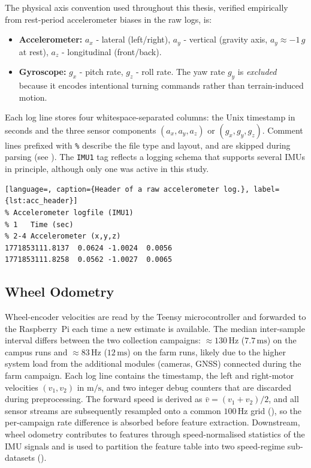 The physical axis convention used throughout this thesis, verified empirically from rest-period accelerometer biases in the raw logs, is:
\begin{itemize}
    \item \textbf{Accelerometer:} $a_x$ - lateral (left/right), $a_y$ - vertical (gravity axis, $a_y \approx -1\,g$ at  rest), $a_z$ - longitudinal (front/back).
    \item \textbf{Gyroscope:} $g_x$ - pitch rate, $g_z$ - roll rate. The yaw rate $g_y$ is \emph{excluded} because it encodes intentional turning commands rather than terrain-induced motion.
\end{itemize}

Each log line stores four whitespace-separated columns: the Unix timestamp in seconds and the three sensor components $(a_x,a_y,a_z)$ or $(g_x,g_y,g_z)$. Comment lines prefixed with \texttt{\%} describe the file type and layout, and are skipped during parsing (see ). The \texttt{IMU1} tag reflects a logging schema that supports several IMUs in principle, although only one was active in this study.

\begin{lstlisting}[language=, caption={Header of a raw accelerometer log.}, label={lst:acc_header}]
% Accelerometer logfile (IMU1)
% 1   Time (sec)
% 2-4 Accelerometer (x,y,z)
1771853111.8137  0.0624 -1.0024  0.0056
1771853111.8258  0.0562 -1.0027  0.0065
\end{lstlisting}


\subsection{Wheel Odometry}

Wheel-encoder velocities are read by the Teensy microcontroller and forwarded to the Raspberry~Pi each time a new estimate is available. The median inter-sample interval differs between the two collection campaigns: $\approx 130\,\text{Hz}$ ($7.7\,\text{ms}$) on the campus runs and $\approx 83\,\text{Hz}$ ($12\,\text{ms}$) on the farm runs, likely due to the higher system load from the additional modules (cameras, GNSS) connected during the farm campaign. Each log line contains the timestamp, the left and right-motor velocities $(v_1, v_2)$ in $\text{m}/\text{s}$, and two integer debug counters that are discarded during preprocessing. The forward speed is derived as $\bar v = (v_1 + v_2)/2$, and all sensor streams are subsequently resampled onto a common $100\,\text{Hz}$ grid (), so the per-campaign rate difference is absorbed before feature extraction. Downstream, wheel odometry contributes to features through speed-normalised statistics of the IMU signals and is used to partition the feature table into two speed-regime sub-datasets ().


